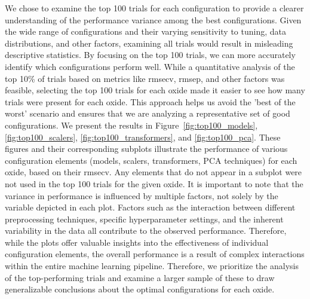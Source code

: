 We chose to examine the top 100 trials for each configuration to provide a clearer understanding of the performance variance among the best configurations.
Given the wide range of configurations and their varying sensitivity to tuning, data distributions, and other factors, examining all trials would result in misleading descriptive statistics.
By focusing on the top 100 trials, we can more accurately identify which configurations perform well.
While a quantitative analysis of the top 10\% of trials based on metrics like \gls{rmsecv}, \gls{rmsep}, and other factors was feasible, selecting the top 100 trials for each oxide made it easier to see how many trials were present for each oxide.
This approach helps us avoid the 'best of the worst' scenario and ensures that we are analyzing a representative set of good configurations.
We present the results in Figure~\ref{fig:top100_models}, \ref{fig:top100_scalers}, \ref{fig:top100_transformers}, and \ref{fig:top100_pca}.
These figures and their corresponding subplots illustrate the performance of various configuration elements (models, scalers, transformers, PCA techniques) for each oxide, based on their \gls{rmsecv}.
Any elements that do not appear in a subplot were not used in the top 100 trials for the given oxide.
It is important to note that the variance in performance is influenced by multiple factors, not solely by the variable depicted in each plot.
Factors such as the interaction between different preprocessing techniques, specific hyperparameter settings, and the inherent variability in the data all contribute to the observed performance.
Therefore, while the plots offer valuable insights into the effectiveness of individual configuration elements, the overall performance is a result of complex interactions within the entire machine learning pipeline.
Therefore, we prioritize the analysis of the top-performing trials and examine a larger sample of these to draw generalizable conclusions about the optimal configurations for each oxide.

